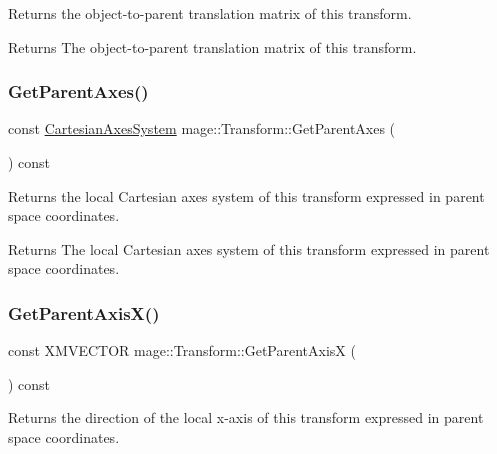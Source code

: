 Returns the object-\/to-\/parent translation matrix of this transform.

\begin{DoxyReturn}{Returns}
The object-\/to-\/parent translation matrix of this transform. 
\end{DoxyReturn}
\hypertarget{classmage_1_1_transform_aad9c46d73c7afd7412a65fe5381ae4b6}{}\label{classmage_1_1_transform_aad9c46d73c7afd7412a65fe5381ae4b6} 
\subsubsection{\texorpdfstring{Get\+Parent\+Axes()}{GetParentAxes()}}
{\footnotesize\ttfamily const \hyperlink{structmage_1_1_cartesian_axes_system}{Cartesian\+Axes\+System} mage\+::\+Transform\+::\+Get\+Parent\+Axes (\begin{DoxyParamCaption}{ }\end{DoxyParamCaption}) const\hspace{0.3cm}{\ttfamily [noexcept]}}

Returns the local Cartesian axes system of this transform expressed in parent space coordinates.

\begin{DoxyReturn}{Returns}
The local Cartesian axes system of this transform expressed in parent space coordinates. 
\end{DoxyReturn}
\hypertarget{classmage_1_1_transform_a552e7b9e654d57e6ba6281eaa6d25ca2}{}\label{classmage_1_1_transform_a552e7b9e654d57e6ba6281eaa6d25ca2} 
\subsubsection{\texorpdfstring{Get\+Parent\+Axis\+X()}{GetParentAxisX()}}
{\footnotesize\ttfamily const X\+M\+V\+E\+C\+T\+OR mage\+::\+Transform\+::\+Get\+Parent\+AxisX (\begin{DoxyParamCaption}{ }\end{DoxyParamCaption}) const\hspace{0.3cm}{\ttfamily [noexcept]}}

Returns the direction of the local x-\/axis of this transform expressed in parent space coordinates.


